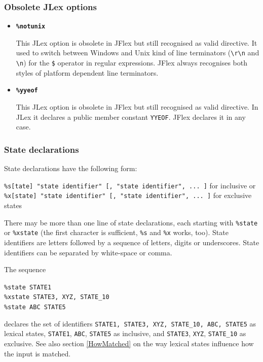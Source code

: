 \documentclass[11pt]{scrartcl}
\begin{document}
\subsubsection{Obsolete JLex options\label{Obsolete}}
\begin{itemize}
\item
{\bf \texttt{\%notunix}}

This JLex option is obsolete in JFlex but still recognised as valid directive.
It used to switch between Windows and Unix kind of line terminators (\verb+\r\n+
and \verb+\n+) for the \texttt{\$} operator in regular expressions. JFlex
always recognises both styles of platform dependent line terminators.
 
\item
{\bf \texttt{\%yyeof}}

This JLex option is obsolete in JFlex but still recognised as valid directive.
In JLex it declares a public member constant \texttt{YYEOF}. JFlex declares it in any case.
\end{itemize}

\subsubsection{State declarations\label{StateDecl}}
State declarations have the following form:

\texttt{\%s[tate] "state identifier" [, "state identifier", ... ]} for inclusive or\\
\texttt{\%x[state] "state identifier" [, "state identifier", ... ]} for exclusive states

There may be more than one line of state declarations, each starting with
\texttt{\%state} or \texttt{\%xstate} (the first character is sufficient,
\texttt{\%s} and \texttt{\%x} works, too). State identifiers are letters followed 
by a sequence of letters, digits or underscores. State identifiers can be separated 
by white-space or comma.

The sequence

\texttt{\%state STATE1}\\
\texttt{\%xstate STATE3, XYZ, STATE\_10}\\
\texttt{\%state ABC STATE5}

declares the set of identifiers \texttt{{STATE1, STATE3, XYZ,
    STATE\_10, ABC, STATE5}} as lexical states, \texttt{STATE1}, \texttt{ABC}, \texttt{STATE5}
as inclusive, and \texttt{STATE3}, \texttt{XYZ}, \texttt{STATE\_10} as exclusive. 
See also section
\ref{HowMatched} on the way lexical states influence how the input is
matched.
 
\end{document}
